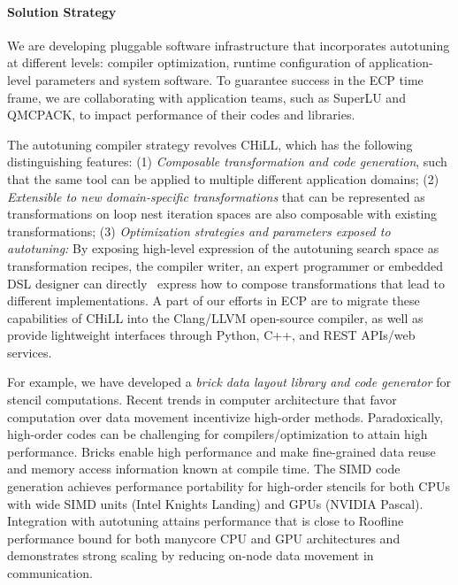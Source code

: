 \paragraph{Solution Strategy}
We are developing pluggable software infrastructure that incorporates
autotuning at different levels: compiler optimization, runtime configuration of application-level parameters and system software.
To guarantee success in the ECP time frame, we are collaborating with
application teams, such as SuperLU and QMCPACK, to impact performance of their
codes and libraries.

The autotuning compiler strategy revolves CHiLL, which has the following distinguishing features:
(1) \textit{Composable transformation and code generation}, such
that the same tool can be applied
to multiple different application domains;
(2) \textit{Extensible to new domain-specific transformations} that can be represented as transformations on loop nest iteration spaces are also
composable with existing transformations;
(3) \textit{Optimization strategies and parameters exposed to autotuning:}
By exposing high-level expression
of the autotuning search space as transformation recipes, the compiler writer, an expert programmer or embedded DSL designer can directly \
express how to compose
 transformations that lead to different implementations.
A part of our efforts in ECP are to migrate these capabilities of CHiLL
into the Clang/LLVM open-source compiler, as well as provide lightweight
interfaces through Python, C++, and REST APIs/web services.

For example, we have developed a \textit{brick data layout library and code generator} for
stencil computations.
Recent trends in computer architecture that favor computation over data movement incentivize high-order methods.  Paradoxically, high-order codes can be challenging for compilers/optimization to attain high performance.  Bricks enable high performance and make fine-grained data reuse and memory access information known at compile time.  The SIMD code generation achieves performance portability
for high-order stencils for both CPUs with wide SIMD units (Intel Knights
Landing) and GPUs (NVIDIA Pascal).  Integration with autotuning attains
performance that is close to Roofline performance bound for both manycore CPU
and GPU architectures and demonstrates strong scaling by reducing on-node data movement in communication.


